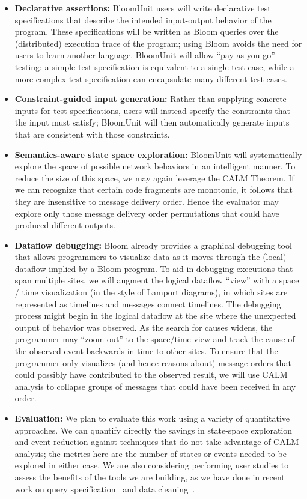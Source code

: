 \begin{itemize}
\item \textbf{Declarative assertions:}
BloomUnit users will write declarative test specifications that describe the 
intended input-output behavior of the program. These specifications will be 
written 
as Bloom queries over the (distributed) execution trace of the program; 
using Bloom avoids the need for users to learn another language. 
BloomUnit will allow ``pay as you go'' testing: a simple test specification 
is equivalent to a single test case, while a more complex test specification 
can encapsulate many different test cases.


\item \textbf{Constraint-guided input generation:}
Rather than supplying concrete inputs for test specifications, users will 
instead 
specify the constraints that the input must satisfy; BloomUnit will then 
automatically generate inputs that are consistent with those constraints.

\item \textbf{Semantics-aware state space exploration:}
  BloomUnit will systematically explore the space of possible network behaviors
  in an intelligent manner. To reduce the size of this space, we may again
  leverage the CALM Theorem.  If we can recognize that certain code fragments
  are monotonic, it follows that they are insensitive to message delivery order.
  Hence the evaluator may explore only those message delivery order permutations
  that could have produced different outputs.

\item \textbf{Dataflow debugging:}  Bloom already provides a graphical debugging tool that allows programmers
to visualize data as it moves through the (local) dataflow implied by a Bloom program.  To aid in debugging
executions that span multiple sites,  we will augment the logical dataflow ``view'' with a space / time visualization
(in the style of Lamport diagrams), in which sites are represented as timelines and messages connect timelines.
The debugging process might begin in the logical dataflow at the site where the unexpected output of behavior was observed.
As the search for causes widens, the programmer may ``zoom out'' to the space/time view and track the cause of the observed
event backwards in time to other sites.  To ensure that the programmer only visualizes (and hence reasons about) message orders
that could possibly have contributed to the observed result, we will use CALM analysis to collapse groups of messages that
could have been received in any order.  

\item \textbf{Evaluation:}  We plan to evaluate this work using a variety of quantitative approaches.  We can quantify directly the savings in state-space exploration and event reduction against techniques that do not take advantage of CALM analysis; the metrics here are the number of states or events needed to be explored in either case.  We are also considering performing user studies to assess the benefits of the tools we are building, as we have done in recent work on query specification~\cite{dataplay} and data cleaning~\cite{2011-wrangler}.
\end{itemize}


